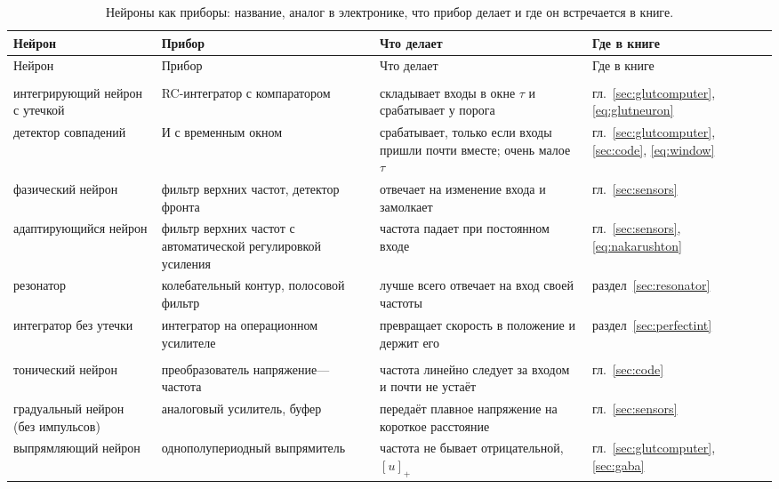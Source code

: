 \begin{center}
\footnotesize
\setlength{\tabcolsep}{3pt}
\renewcommand{\arraystretch}{1.15}
\begin{longtable}{>{\raggedright}p{3.1cm}>{\raggedright}p{3.3cm}>{\raggedright}p{4.7cm}>{\raggedright\arraybackslash}p{2.4cm}}
\caption{Нейроны как приборы: название, аналог в электронике, что прибор делает и где он встречается в книге.}\label{tab:eetypes}\\
\toprule
Нейрон & Прибор & Что делает & Где в книге \\
\midrule
\endfirsthead
\toprule
Нейрон & Прибор & Что делает & Где в книге \\
\midrule
\endhead
\bottomrule
\endfoot
\multicolumn{4}{l}{\emph{Фильтры и интеграторы}} \\
интегрирующий нейрон с утечкой & RC-интегратор с компаратором & складывает входы в окне $\tau$ и срабатывает у порога & гл.~\ref{sec:glutcomputer}, \eqref{eq:glutneuron} \\
детектор совпадений & И с временным окном & срабатывает, только если входы пришли почти вместе; очень малое $\tau$ & гл.~\ref{sec:glutcomputer}, \ref{sec:code}, \eqref{eq:window} \\
фазический нейрон & фильтр верхних частот, детектор фронта & отвечает на изменение входа и замолкает & гл.~\ref{sec:sensors} \\
адаптирующийся нейрон & фильтр верхних частот с автоматической регулировкой усиления & частота падает при постоянном входе & гл.~\ref{sec:sensors}, \eqref{eq:nakarushton} \\
резонатор & колебательный контур, полосовой фильтр & лучше всего отвечает на вход своей частоты & раздел~\ref{sec:resonator} \\
интегратор без утечки & интегратор на операционном усилителе & превращает скорость в положение и держит его & раздел~\ref{sec:perfectint} \\
\midrule
\multicolumn{4}{l}{\emph{Преобразователи}} \\
тонический нейрон & преобразователь напряжение---частота & частота линейно следует за входом и почти не устаёт & гл.~\ref{sec:code} \\
градуальный нейрон (без импульсов) & аналоговый усилитель, буфер & передаёт плавное напряжение на короткое расстояние & гл.~\ref{sec:sensors} \\
выпрямляющий нейрон & однополупериодный выпрямитель & частота не бывает отрицательной, $[u]_+$ & гл.~\ref{sec:glutcomputer}, \ref{sec:gaba} \\

\end{longtable}
\end{center}
